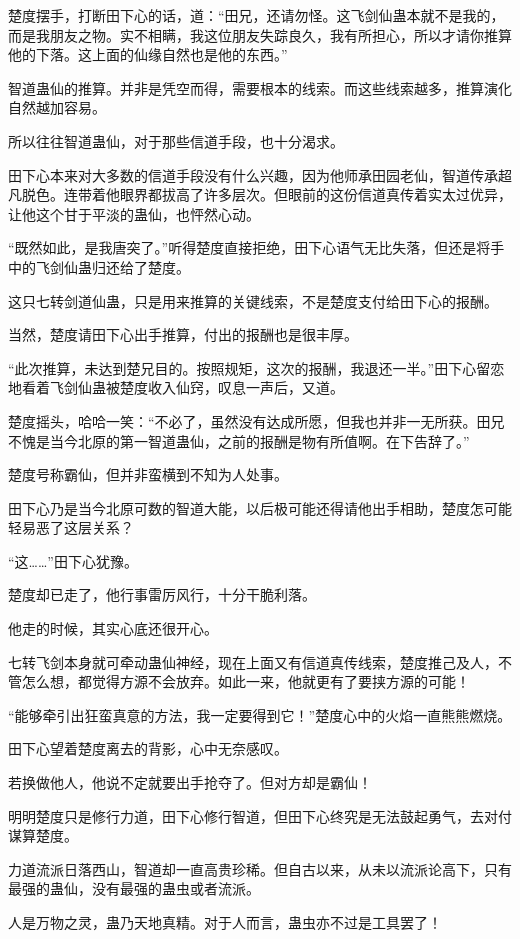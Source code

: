 \begin{this_body}
楚度摆手，打断田下心的话，道：“田兄，还请勿怪。这飞剑仙蛊本就不是我的，而是我朋友之物。实不相瞒，我这位朋友失踪良久，我有所担心，所以才请你推算他的下落。这上面的仙缘自然也是他的东西。”

智道蛊仙的推算。并非是凭空而得，需要根本的线索。而这些线索越多，推算演化自然越加容易。

所以往往智道蛊仙，对于那些信道手段，也十分渴求。

田下心本来对大多数的信道手段没有什么兴趣，因为他师承田园老仙，智道传承超凡脱色。连带着他眼界都拔高了许多层次。但眼前的这份信道真传着实太过优异，让他这个甘于平淡的蛊仙，也怦然心动。

“既然如此，是我唐突了。”听得楚度直接拒绝，田下心语气无比失落，但还是将手中的飞剑仙蛊归还给了楚度。

这只七转剑道仙蛊，只是用来推算的关键线索，不是楚度支付给田下心的报酬。

当然，楚度请田下心出手推算，付出的报酬也是很丰厚。

“此次推算，未达到楚兄目的。按照规矩，这次的报酬，我退还一半。”田下心留恋地看着飞剑仙蛊被楚度收入仙窍，叹息一声后，又道。

楚度摇头，哈哈一笑：“不必了，虽然没有达成所愿，但我也并非一无所获。田兄不愧是当今北原的第一智道蛊仙，之前的报酬是物有所值啊。在下告辞了。”

楚度号称霸仙，但并非蛮横到不知为人处事。

田下心乃是当今北原可数的智道大能，以后极可能还得请他出手相助，楚度怎可能轻易恶了这层关系？

“这……”田下心犹豫。

楚度却已走了，他行事雷厉风行，十分干脆利落。

他走的时候，其实心底还很开心。

七转飞剑本身就可牵动蛊仙神经，现在上面又有信道真传线索，楚度推己及人，不管怎么想，都觉得方源不会放弃。如此一来，他就更有了要挟方源的可能！

“能够牵引出狂蛮真意的方法，我一定要得到它！”楚度心中的火焰一直熊熊燃烧。

田下心望着楚度离去的背影，心中无奈感叹。

若换做他人，他说不定就要出手抢夺了。但对方却是霸仙！

明明楚度只是修行力道，田下心修行智道，但田下心终究是无法鼓起勇气，去对付谋算楚度。

力道流派日落西山，智道却一直高贵珍稀。但自古以来，从未以流派论高下，只有最强的蛊仙，没有最强的蛊虫或者流派。

人是万物之灵，蛊乃天地真精。对于人而言，蛊虫亦不过是工具罢了！


\end{this_body}

